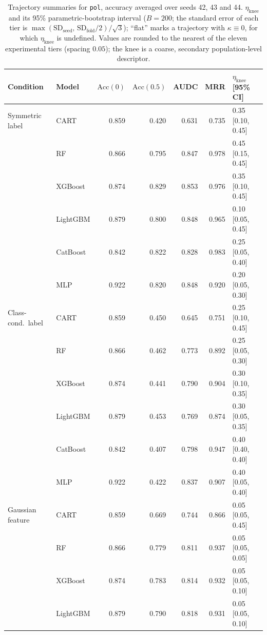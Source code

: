 \documentclass[pdflatex,sn-mathphys]{sn-jnl}
\theoremstyle{thmstyleone}
\begin{document}
\begin{table}[htbp]
\centering
\scriptsize
\setlength{\tabcolsep}{3.5pt}
\caption{Trajectory summaries for \texttt{pol}, accuracy averaged over seeds 42, 43 and 44. $\eta_{\mathrm{knee}}$ and its 95\% parametric-bootstrap interval ($B=200$; the standard error of each tier is $\max(\mathrm{SD}_{\mathrm{seed}},\,\mathrm{SD}_{\mathrm{fold}}/2)/\sqrt3$); ``flat'' marks a trajectory with $\kappa\equiv 0$, for which $\eta_{\mathrm{knee}}$ is undefined. Values are rounded to the nearest of the eleven experimental tiers (spacing $0.05$); the knee is a coarse, secondary population-level descriptor.}
\label{tab:traj_pol}
\begin{tabular}{@{}llrrrrl@{}}
\toprule
Condition & Model & $\mathrm{Acc}(0)$ & $\mathrm{Acc}(0.5)$ & AUDC & MRR & $\eta_{\mathrm{knee}}$ [95\% CI] \\
\midrule
Symmetric label & CART & 0.859 & 0.420 & 0.631 & 0.735 & 0.35 [0.10, 0.45] \\
 & RF & 0.866 & 0.795 & 0.847 & 0.978 & 0.45 [0.15, 0.45] \\
 & XGBoost & 0.874 & 0.829 & 0.853 & 0.976 & 0.35 [0.10, 0.45] \\
 & LightGBM & 0.879 & 0.800 & 0.848 & 0.965 & 0.10 [0.05, 0.45] \\
 & CatBoost & 0.842 & 0.822 & 0.828 & 0.983 & 0.25 [0.05, 0.40] \\
 & MLP & 0.922 & 0.820 & 0.848 & 0.920 & 0.20 [0.05, 0.30] \\
\midrule
Class-cond.\ label & CART & 0.859 & 0.450 & 0.645 & 0.751 & 0.25 [0.10, 0.45] \\
 & RF & 0.866 & 0.462 & 0.773 & 0.892 & 0.25 [0.05, 0.30] \\
 & XGBoost & 0.874 & 0.441 & 0.790 & 0.904 & 0.30 [0.10, 0.35] \\
 & LightGBM & 0.879 & 0.453 & 0.769 & 0.874 & 0.30 [0.05, 0.35] \\
 & CatBoost & 0.842 & 0.407 & 0.798 & 0.947 & 0.40 [0.40, 0.40] \\
 & MLP & 0.922 & 0.422 & 0.837 & 0.907 & 0.40 [0.05, 0.40] \\
\midrule
Gaussian feature & CART & 0.859 & 0.669 & 0.744 & 0.866 & 0.05 [0.05, 0.45] \\
 & RF & 0.866 & 0.779 & 0.811 & 0.937 & 0.05 [0.05, 0.05] \\
 & XGBoost & 0.874 & 0.783 & 0.814 & 0.932 & 0.05 [0.05, 0.10] \\
 & LightGBM & 0.879 & 0.790 & 0.818 & 0.931 & 0.05 [0.05, 0.10] \\

\end{tabular}
\end{table}
\end{document}

